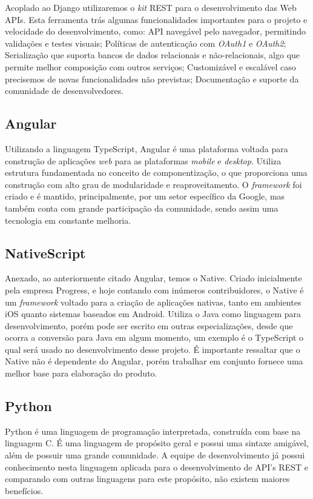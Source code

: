 		Acoplado ao Django utilizaremos o \textit{kit} REST para o desenvolvimento das Web APIs. Esta ferramenta trás algumas funcionalidades importantes para o projeto e velocidade do desenvolvimento, como: API navegável pelo navegador, permitindo validações e testes visuais; Políticas de autenticação com \textit{OAuth1} e \textit{OAuth2}; Serialização que suporta bancos de dados relacionais e não-relacionais, algo que permite melhor composição com outros serviços; Customizável e escalável caso precisemos de novas funcionalidades não previstas; Documentação e suporte da comunidade de desenvolvedores.

	\subsection{Angular}
	Utilizando a linguagem TypeScript, Angular é uma plataforma voltada para construção de aplicações \textit{web} para as plataformas \textit{mobile} e \textit{desktop}. Utiliza estrutura fundamentada no conceito de componentização, o que proporciona uma construção com alto grau de modularidade e reaproveitamento.
O \textit{framework} foi criado e é mantido, principalmente, por um setor específico da Google, mas também conta com grande participação da comunidade, sendo assim uma tecnologia em constante melhoria.

	\subsection{NativeScript}
	Anexado, ao anteriormente citado Angular, temos o Native. Criado inicialmente pela empresa Progress, e hoje contando com inúmeros contribuidores, o Native é um \textit{framework} voltado para a criação de aplicações nativas, tanto em ambientes iOS quanto sistemas baseados em Android. Utiliza o Java como linguagem para desenvolvimento, porém pode ser escrito em outras especializações, desde que ocorra a conversão para Java em algum momento, um exemplo é o TypeScript o qual será usado no desenvolvimento desse projeto. É importante ressaltar que o Native não é dependente do Angular, porém trabalhar em conjunto fornece uma melhor base para elaboração do produto. 

    \subsection{Python}
    Python é uma linguagem de programação interpretada, construída com base na linguagem C. É uma linguagem
    de propósito geral e possui uma sintaxe amigável, além de possuir uma grande comunidade. A equipe de
    desenvolvimento já possui conhecimento nesta linguagem aplicada para o desenvolvimento de API's REST e
    comparando com outras linguagens para este propósito, não existem maiores benefícios.



